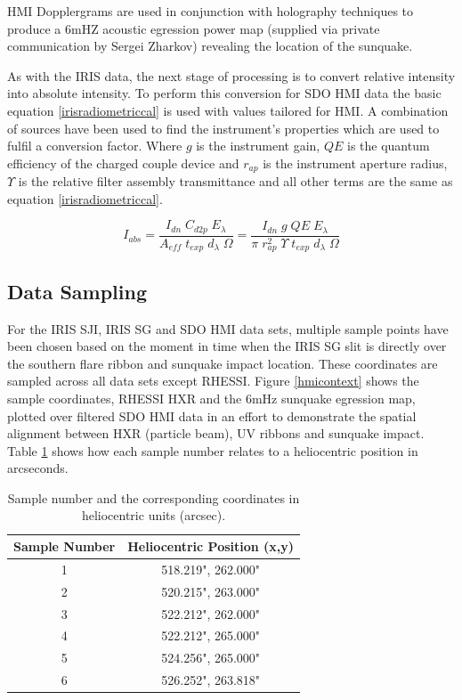 \documentclass[11pt]{article}
\begin{document}
HMI Dopplergrams are used in conjunction with holography techniques to produce a 6mHZ acoustic egression power map (supplied via private communication by Sergei Zharkov) revealing the location of the sunquake. 

As with the IRIS data, the next stage of processing is to convert relative intensity into absolute intensity. To perform this conversion for SDO HMI data the basic equation \ref{irisradiometriccal} is used with values tailored for HMI. A combination of sources \citep{2012SoPh..275...41B, 2012SoPh..275..285C} have been used to find the instrument's properties which are used to fulfil a conversion factor. Where $g$ is the instrument gain, $QE$ is the quantum efficiency of the charged couple device and $r_{ap}$ is the instrument aperture radius, $\Upsilon$ is the relative filter assembly transmittance and all other terms are the same as equation \ref{irisradiometriccal}.


\begin{equation}\label{hmiradiometriccal}
I_{abs} = \frac{I_{dn} \; C_{d2p} \; E_{\lambda}}{A_{eff} \; t_{exp} \; d_{\lambda} \; \Omega} 
        = \frac{I_{dn} \; g \; QE \; E_{\lambda}}{\pi \; r_{ap}^{2} \; \Upsilon \; t_{exp} \; d_{\lambda} \; \Omega} 
\end{equation}


\subsection{Data Sampling}
For the IRIS SJI, IRIS SG and SDO HMI data sets, multiple sample points have been chosen based on the moment in time when the IRIS SG slit is directly over the southern flare ribbon and sunquake impact location. These coordinates are sampled across all data sets except RHESSI. Figure \ref{hmicontext} shows the sample coordinates, RHESSI HXR and the 6mHz sunquake egression map, plotted over filtered SDO HMI data in an effort to demonstrate the spatial alignment between HXR (particle beam), UV ribbons and sunquake impact. Table \ref{coordtab} shows how each sample number relates to a heliocentric position in arcseconds.


\begin{table}[h]

\begin{tabular}{|c|c|}
\hline
Sample Number & Heliocentric Position (x,y)\\
\hline
1 & 518.219", 262.000"\\
2 & 520.215", 263.000"\\
3 & 522.212", 262.000"\\
4 & 522.212", 265.000"\\
5 & 524.256", 265.000"\\
6 & 526.252", 263.818"\\
\hline
\end{tabular}
\caption{Sample number and the corresponding coordinates in heliocentric units (arcsec).}\label{coordtab}
\end{table}
\end{document}
